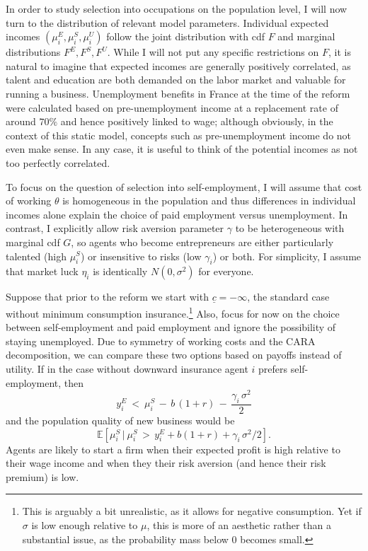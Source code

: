 In order to study selection into occupations on the population level, I will now turn to the distribution of relevant model parameters. Individual expected incomes $(\mu_i^E, \mu_i^S, \mu_i^U)$ follow the joint distribution with cdf $F$ and marginal distributions $F^E, F^S, F^U$. While I will not put any specific restrictions on $F$, it is natural to imagine that expected incomes are generally positively correlated, as talent and education are both demanded on the labor market and valuable for running a business. Unemployment benefits in France at the time of the reform were calculated based on pre-unemployment income at a replacement rate of around $70\%$ and hence positively linked to wage; although obviously, in the context of this static model, concepts such as pre-unemployment income do not even make sense. In any case, it is useful to think of the potential incomes as not too perfectly correlated. \newline

\noindent To focus on the question of selection into self-employment, I will assume that  cost of working $\theta$ is homogeneous in the population and thus differences in individual incomes alone explain the choice of paid employment versus unemployment. In contrast, I explicitly allow risk aversion parameter $\gamma$ to be heterogeneous with marginal cdf $G$, so agents who become entrepreneurs are either particularly talented (high $\mu_i^S$) or insensitive to risks (low $\gamma_i$) or both. For simplicity, I assume that market luck $\eta_i$ is identically $N(0, \sigma^2)$ for everyone. \newline

\noindent Suppose that prior to the reform we start with $\underline{c} = - \infty$, the standard case without minimum consumption insurance.\footnote{This is arguably a bit unrealistic, as it allows for negative consumption. Yet if $\sigma$ is low enough relative to $\mu$, this is more of an aesthetic rather than a substantial issue, as the probability mass below $0$ becomes small.}
Also, focus for now on the choice between self-employment and paid employment and ignore the possibility of staying unemployed. Due to symmetry of working costs and the CARA decomposition, we can compare these two options based on payoffs instead of utility. If in the case without downward insurance agent $i$ prefers self-employment, then 
\begin{equation}
y^E_i \:  < \:  \mu^S_i \, - \,  b \, (1+r) \, - \, \frac{\gamma_i \, \sigma^2}{2}
\end{equation} 
and the population quality of new business would be 
\begin{equation}
\mathbb{E}\left[\mu_i^S \, | \: \mu_i^S \, > \, y_i^E + b(1+r) + \gamma_i \, \sigma^2 / 2\right].
\end{equation}
Agents are likely to start a firm when their expected profit is high relative to their wage income and when they their risk aversion (and hence their risk premium) is low. 


